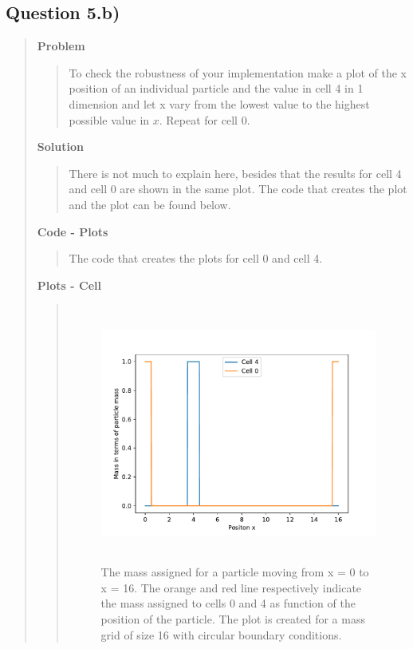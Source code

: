 
\subsection*{\textbf{Question 5.b)}}
\begin{quote}

\textbf{Problem}
\begin{quote}
To check the robustness of your implementation make a plot of the x position of an individual particle and the value in cell 4 in 1 dimension and let x vary from the lowest value to the highest possible value in $x$. Repeat for cell 0.
\end{quote}

\textbf{Solution} 
\begin{quote}
There is not much to explain here, besides that the results for cell 4 and cell 0 are shown in the same plot. The code that creates the plot and the plot can be found below.

\end{quote}

\textbf{Code - Plots}
\begin{quote}
The code that creates the plots for cell 0 and cell 4. 

\end{quote}
\newpage

\textbf{Plots - Cell}
\begin{quote}
\begin{figure}[!ht]
\centering
\includegraphics[width=14cm, height=8.5cm]{./Plots/5b_cell.pdf}
\caption{The mass assigned for a particle moving from x = 0 to x = 16. The orange and red line respectively indicate the mass assigned to cells 0 and 4 as function of the position of the particle. The plot is created for a mass grid of size 16 with circular boundary conditions.  }
\end{figure}

\end{quote}
\end{quote}











